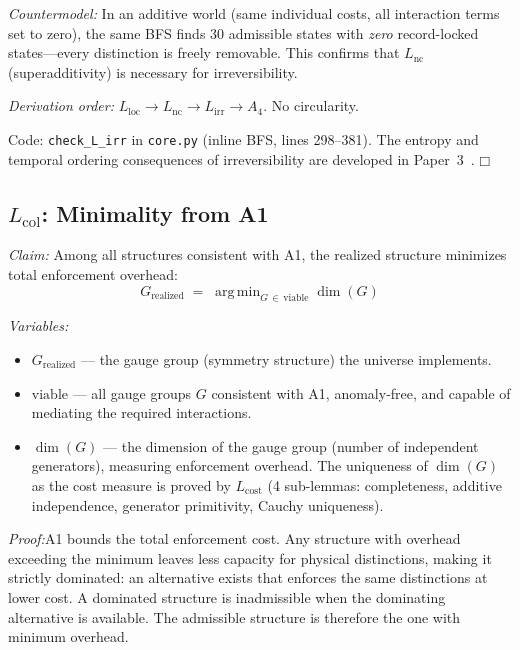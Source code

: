 \documentclass[11pt]{article}
\providecommand{\square}{\ensuremath{\mdlgwhtsquare}}
\newcommand{\Lnc}{L_{\mathrm{nc}}}
\newcommand{\Lloc}{L_{\mathrm{loc}}}
\newcommand{\Lirr}{L_{\mathrm{irr}}}
\newcommand{\Lcol}{L_{\mathrm{col}}}
\DeclareMathOperator*{\argmin}{arg\,min}
\begin{document}
\textit{Countermodel:} In an additive world (same individual costs, all interaction terms set to zero), the same BFS finds 30 admissible states with \emph{zero} record-locked states---every distinction is freely removable.  This confirms that $\Lnc$ (superadditivity) is necessary for irreversibility.

\textit{Derivation order:} $\Lloc \to \Lnc \to \Lirr \to A_4$.  No circularity.

Code: \texttt{check\_L\_irr} in \texttt{core.py} (inline BFS, lines 298--381).  The entropy and temporal ordering consequences of irreversibility are developed in Paper~3~\cite{P3}. \hfill$\square$


\subsection{\texorpdfstring{$L_{\mathrm{col}}$}{Lcol}: Minimality from A1}

\begin{tcolorbox}[apfbox, title={Lemma $\Lcol$ (Minimality / Capacity Optimization) --- Full Proof}]
\textit{Claim:} Among all structures consistent with A1, the realized structure minimizes total enforcement overhead:
\begin{equation}
G_{\mathrm{realized}} \;=\; \argmin_{G \,\in\, \mathrm{viable}} \dim(G)
\label{eq:lcol_argmin}
\end{equation}

\smallskip\noindent\textit{Variables:}
\begin{itemize}[nosep,leftmargin=2em]
\item $G_{\mathrm{realized}}$ --- the gauge group (symmetry structure) the universe implements.
\item $\mathrm{viable}$ --- all gauge groups $G$ consistent with A1, anomaly-free, and capable of mediating the required interactions.
\item $\dim(G)$ --- the dimension of the gauge group (number of independent generators), measuring enforcement overhead.  The uniqueness of $\dim(G)$ as the cost measure is proved by $L_{\mathrm{cost}}$ (4 sub-lemmas: completeness, additive independence, generator primitivity, Cauchy uniqueness).
\end{itemize}
\end{tcolorbox}

\textit{Proof:}\quad A1 bounds the total enforcement cost.  Any structure with overhead exceeding the minimum leaves less capacity for physical distinctions, making it strictly dominated: an alternative exists that enforces the same distinctions at lower cost.  A dominated structure is inadmissible when the dominating alternative is available.  The admissible structure is therefore the one with minimum overhead.
\end{document}
